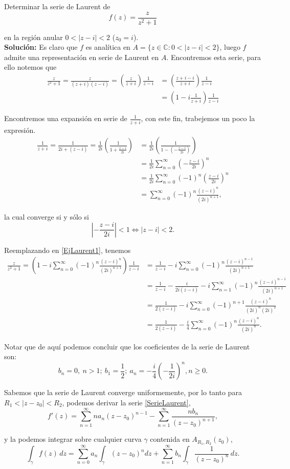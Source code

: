 \begin{ejemplo}
Determinar la serie de Laurent de
$$f(z) = \frac{z}{z^2+1}$$

en la región anular $0 < |z-i| < 2$ ($z_0 = i$).
\\

\textbf{Solución:}  Es claro que $f$ es analítica en $A = \{z \in \mathbb{C}: 0< |z-i| < 2\}$, luego $f$ admite una representación en serie de Laurent en $A$. Encontremos esta serie, para ello notemos que
\begin{align}
    \frac{z}{z^2+1} = \frac{z}{(z+i)(z-i)} = \left( \frac{z}{z+i}\right) \frac{1}{z-i} &= \left( \frac{z+i-i}{z+i}\right) \frac{1}{z-i} \nonumber\\
    &=\left(1 - i\frac{1}{z+i}\right) \frac{1}{z-i} \label{EjLaurent1}
\end{align}

Encontremos una expansión en serie de $\frac{1}{z+i}$, con este fin, trabejemos un poco la expresión.
\begin{align*}
    \frac{1}{z+i} = \frac{1}{2i + (z-i)} = \frac{1}{2i} \left( \frac{1}{1+\frac{z-i}{2i}} \right) &= \frac{1}{2i} \left( \frac{1}{1-\left(-\frac{z-i}{2i}\right)} \right) \\
    &= \frac{1}{2i} \sum_{n=0}^{\infty} \left(-\frac{z-i}{2i} \right)^n \\
    &=  \frac{1}{2i} \sum_{n=0}^{\infty} (-1)^n \left(\frac{z-i}{2i} \right)^n \\
    &= \sum_{n=0}^{\infty} (-1)^n \frac{(z-i)^n}{(2i)^{n+1}},
\end{align*}

la cual converge si y sólo si
$$\left| - \frac{z-i}{2i} \right| < 1 \Leftrightarrow |z-i| < 2.$$

Reemplazando en \eqref{EjLaurent1}, tenemos
\begin{align*}
 \frac{z}{z^2+1} = \left( 1 - i \sum_{n=0}^{\infty} (-1)^n \frac{(z-i)^n}{(2i)^{n+1}} \right) \frac{1}{z-i} &= \frac{1}{z-i} - i \sum_{n=0}^{\infty} (-1)^n \frac{(z-i)^{n-1}}{(2i)^{n+1}} \\
 &=  \frac{1}{z-i} - \frac{i}{2i(z-i)} - i\sum_{n=1}^{\infty} (-1)^n \frac{(z-i)^{n-1}}{(2i)^{n+1}} \\
 &= \frac{1}{2(z-i)} - i\sum_{n=0}^{\infty} (-1)^{n+1} \frac{(z-i)^n}{(2i)^{n} (2i)^2} \\
 &=  \frac{1}{2(z-i)} - \frac{i}{4}\sum_{n=0}^{\infty} (-1)^{n} \frac{(z-i)^n}{(2i)^{n}} .
\end{align*}

Notar que de aquí podemos concluir que los coeficientes de la serie de Laurent son:
$$b_n = 0, ~ n > 1; ~ b_1 = \frac{1}{2}; ~ a_n = - \frac{i}{4} \left( -\frac{1}{2i}\right)^n, n\geq 0.$$
\end{ejemplo}

Sabemos que la serie de Laurent converge uniformemente, por lo tanto para $R_1 < |z-z_0| < R_2$, podemos derivar la serie \eqref{SerieLaurent},
$$f'(z) = \sum_{n=1}^{\infty} n a_n (z-z_0)^{n-1} - \sum_{n=1}^{\infty} \frac{n b_n}{(z-z_0)^{n+1}},$$

y la podemos integrar sobre cualquier curva $\gamma$ contenida en $A_{R_1,R_2}(z_0)$,
$$\int_{\gamma} f(z) \,dz = \sum_{n=0}^{\infty} a_n \int_{\gamma} (z-z_0)^n dz + \sum_{n=1}^{\infty} b_n \int_{\gamma} \frac{1}{(z-z_0)^n} \,dz.$$
